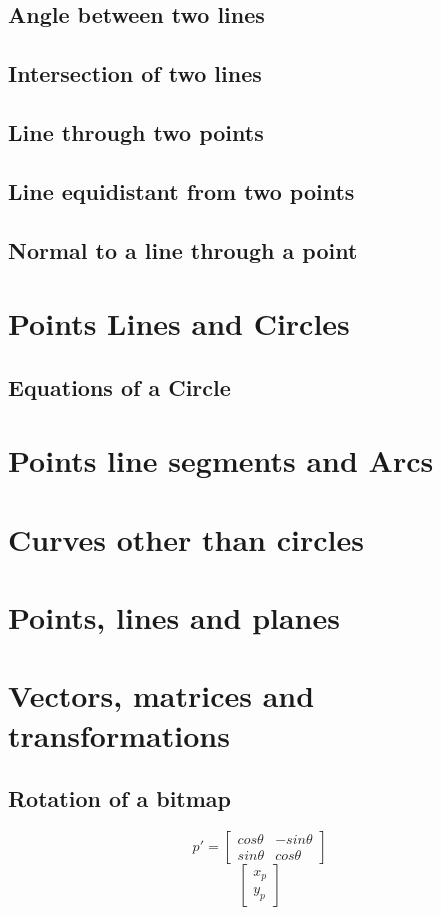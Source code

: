 \documentclass[12pt,a4,oneside,usenames,dvipsnames]{book}
\newcommand\bitmap{{\pixel{}bitmap}}
\begin{document}
\chapter{Angle between two lines}
\chapter{Intersection of two lines}
\chapter{Line through two points}
\chapter{Line equidistant from two points}
\chapter{Normal to a line through a point}
\part{Points Lines and Circles}
\chapter{Equations of a Circle}
\part{Points line segments and Arcs}
\part{Curves other than circles}
\part{Points, lines and planes}
\part{Vectors, matrices and transformations}
\chapter{Rotation of a \bitmap{}}

\[
  p' =
  \begin{bmatrix}
    cosθ & -sinθ\\
    sinθ & cosθ
  \end{bmatrix} \]\[ \begin{bmatrix}
    x_{p}\\
    y_{p}
  \end{bmatrix}
\]
\end{document}
